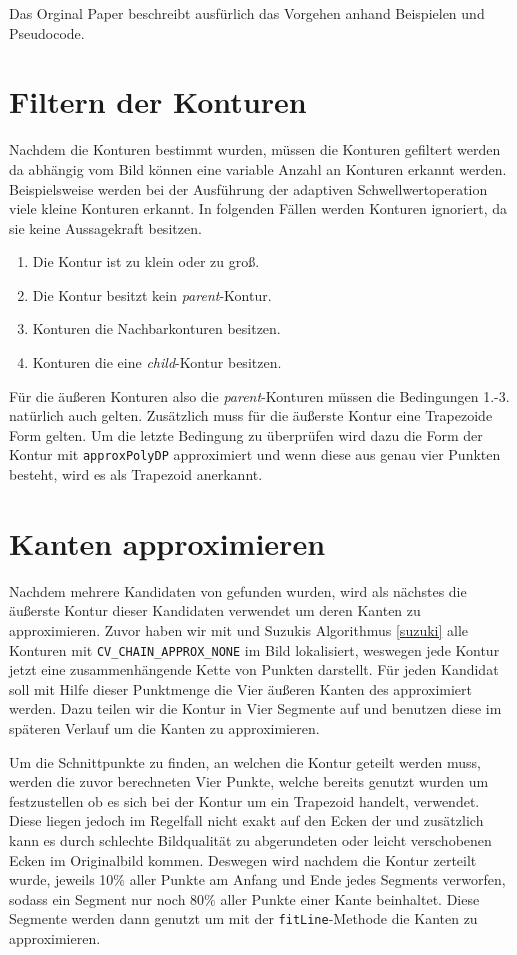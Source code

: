 Das Orginal Paper \cite{journals/cvgip/SuzukiA85} beschreibt ausfürlich das Vorgehen anhand Beispielen und Pseudocode.

\section{Filtern der Konturen}
Nachdem die Konturen bestimmt wurden, müssen die Konturen gefiltert werden da abhängig vom Bild können eine variable Anzahl an Konturen
erkannt werden. Beispielsweise werden bei der Ausführung der adaptiven Schwellwertoperation viele kleine Konturen erkannt. In folgenden Fällen werden Konturen ignoriert, da sie keine Aussagekraft besitzen.
\begin{enumerate}
	\item Die Kontur ist zu klein oder zu groß.
	\item Die Kontur besitzt kein \emph{parent}-Kontur.
	\item Konturen die Nachbarkonturen besitzen.
	\item Konturen die eine \emph{child}-Kontur besitzen.
\end{enumerate}
Für die äußeren Konturen also die \emph{parent}-Konturen müssen die Bedingungen 1.-3. natürlich auch gelten. Zusätzlich muss für die äußerste Kontur eine Trapezoide Form gelten. Um die letzte Bedingung zu überprüfen wird dazu die Form der Kontur mit \texttt{approxPolyDP} approximiert   und wenn diese aus genau vier Punkten besteht, wird es als Trapezoid anerkannt.

\section{Kanten approximieren}
Nachdem mehrere Kandidaten von \fps gefunden wurden, wird als nächstes die äußerste Kontur dieser Kandidaten verwendet um deren Kanten zu approximieren. Zuvor haben wir mit \OpenCV und Suzukis Algorithmus \ref{suzuki} alle Konturen mit \texttt{CV\_CHAIN\_APPROX\_NONE} im Bild lokalisiert, weswegen jede Kontur jetzt eine zusammenhängende Kette von Punkten darstellt. Für jeden Kandidat soll mit Hilfe dieser Punktmenge die Vier äußeren Kanten des \fps approximiert werden. Dazu teilen wir die Kontur in Vier Segmente auf und benutzen diese im späteren Verlauf um die Kanten zu approximieren.

Um die Schnittpunkte zu finden, an welchen die Kontur geteilt werden muss, werden die zuvor berechneten Vier Punkte, welche bereits genutzt wurden um festzustellen ob es sich bei der Kontur um ein Trapezoid handelt, verwendet. Diese liegen jedoch im Regelfall nicht exakt auf den Ecken der \fps und zusätzlich kann es durch schlechte Bildqualität zu abgerundeten oder leicht verschobenen Ecken im Originalbild kommen. Deswegen wird nachdem die Kontur zerteilt wurde, jeweils 10\% aller Punkte am Anfang und Ende jedes Segments verworfen, sodass ein Segment nur noch 80\% aller Punkte einer Kante beinhaltet. Diese Segmente werden dann genutzt um mit der \texttt{fitLine}-Methode die Kanten zu approximieren.

